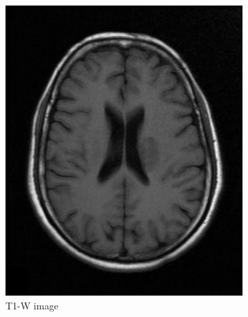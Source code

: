 \documentclass{standalone}
\begin{document}
\begin{figure}[h!]
		\centering
        \begin{subfigure}[b]{0.325\textwidth}
             \includegraphics[scale=0.365]{img/Chap1/T1_example.png}
             \caption{T1-W image}
             \label{fig:T1_example}
        \end{subfigure}
        \hfill
        \begin{subfigure}[b]{0.325\textwidth}

\end{subfigure}
\end{figure}
\end{document}
